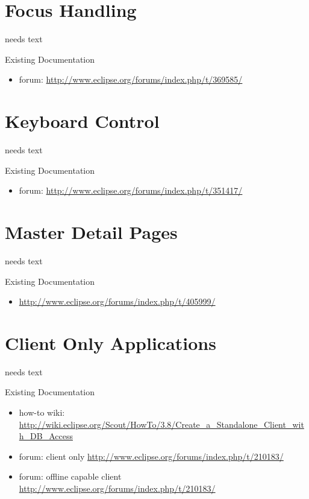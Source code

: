 \documentclass[a4paper,10pt,twoside]{book}
\begin{document}
{%
\section{Focus Handling}
needs text

\noindent Existing Documentation
\begin{itemize}
  \item forum: \url{http://www.eclipse.org/forums/index.php/t/369585/}
\end{itemize}

\section{Keyboard Control}
needs text

\noindent Existing Documentation
\begin{itemize}
  \item forum: \url{http://www.eclipse.org/forums/index.php/t/351417/}
\end{itemize}

\section{Master Detail Pages}
needs text

\noindent Existing Documentation
\begin{itemize}
  \item \url{http://www.eclipse.org/forums/index.php/t/405999/}
\end{itemize}

\section{Client Only Applications}
needs text

\noindent Existing Documentation
\begin{itemize}
  \item how-to wiki: \url{http://wiki.eclipse.org/Scout/HowTo/3.8/Create_a_Standalone_Client_with_DB_Access}
  \item forum: client only \url{http://www.eclipse.org/forums/index.php/t/210183/}
  \item forum: offline capable client \url{http://www.eclipse.org/forums/index.php/t/210183/}
\end{itemize}


}
\end{document}
